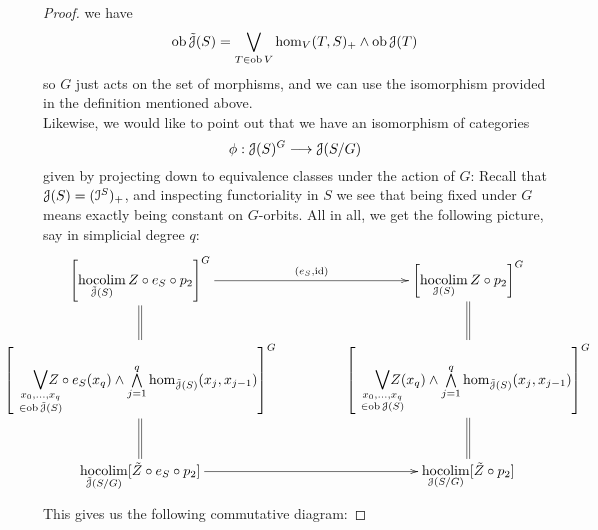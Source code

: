 \begin{lem}
\begin{proof}
      we have
      \begin{displaymath}
        \operatorname{ob} \tilde{\mathcal{J}}(S) = \bigvee_{T \in \operatorname{ob} V} \operatorname{hom}_V (T,S)_+ 
          \wedge \operatorname{ob} \mathcal{J}(T)
      \end{displaymath}
      so $G$ just acts on the set of morphisms, and we can use the isomorphism
      provided in the definition mentioned above.\\
      Likewise, we would like to point out that we have an isomorphism of
      categories
      \begin{displaymath}
        \phi: \mathcal{J}(S)^G \longrightarrow \mathcal{J}(S/G)
      \end{displaymath}
      given by projecting down to equivalence classes under the action of $G$:
      Recall that $\mathcal{J}(S) = (\mathcal{I}^S)_+$, and inspecting functoriality in $S$ we
      see that being fixed under $G$ means exactly being constant on $G$-orbits.
      All in all, we get the following picture, say in simplicial degree $q$:
      \begin{displaymath}
        \noindent\makebox[\textwidth]{
        \xymatrix@C+2em{
          \left[ \hocolim\limits_{\tilde{\cJ}(S)} Z \circ e_S \circ p_2
            \right]^G
            \ar[r]^-{(e_S, \id)}
            \ar@{=}[d]
          &
          \left[\hocolim\limits_{\cJ(S)} Z \circ p_2 \right]^G
            \ar@{=}[d]
          \\
          \left[\;\;\;\;\;
            \mathlarger{\mathlarger{\bigvee}}\limits_%
            {\mathclap{\substack{x_0, \ldots, x_q \\ \in \ob \tilde{\cJ}(S)}}}
          Z \circ e_S (x_q) \wedge \bigwedge\limits_{j=1}^q
          \hom_{\tilde{\cJ}(S)}(x_j, x_{j-1})
          \right]^G
            \ar@{=}[d]
          &
          \left[\;\;\;\;\;
          \mathlarger{\mathlarger{\bigvee}}\limits_%
            {\mathclap{\substack{x_0, \ldots, x_q \\ \in \ob \cJ(S)}}}
          Z (x_q) \wedge \bigwedge\limits_{j=1}^q
          \hom_{\tilde{\cJ}(S)}(x_j, x_{j-1})
          \right]^G
            \ar@{=}[d]
          \\
          \hocolim\limits_{\tilde{\cJ}(S/G)} [\tilde{Z} \circ e_S \circ p_2]
            \ar[r]
          &
          \hocolim\limits_{\cJ(S/G)} [\tilde{Z} \circ p_2 ]
        }
        }
      \end{displaymath}
      This gives us the following commutative diagram:

\end{proof}
\end{lem}

